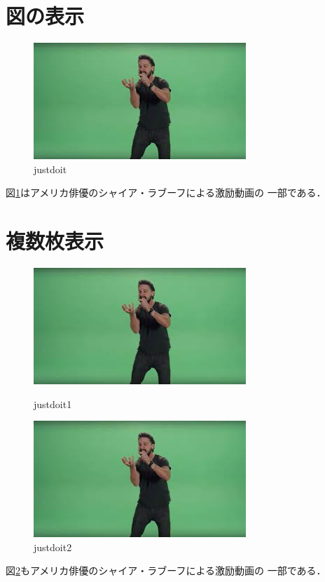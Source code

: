 \documentclass[a4j]{jarticle}
\begin{document}
\section{図の表示}
\begin{figure}[htbp]
    \centering
    \includegraphics[keepaspectratio]{justdoit.jpg}
    \caption{justdoit}
    \label{justdoit}
\end{figure}
図\ref{justdoit}はアメリカ俳優のシャイア・ラブーフによる激励動画の
一部である．

\section{複数枚表示}
\begin{figure}[htbp]
    \begin{minipage}[b]{0.45\linewidth} %
        \centering
        \includegraphics[keepaspectratio, scale=0.5]{justdoit.jpg}
        \caption{justdoit1}
        \label{justdoit1}
    \end{minipage}
    \begin{minipage}[b]{0.45\linewidth}
        \centering
        \includegraphics[keepaspectratio, scale=0.5]{justdoit.jpg}
        \caption{justdoit2}
    \end{minipage}
\end{figure}
図\ref{justdoit1}もアメリカ俳優のシャイア・ラブーフによる激励動画の
一部である．
\end{document}
